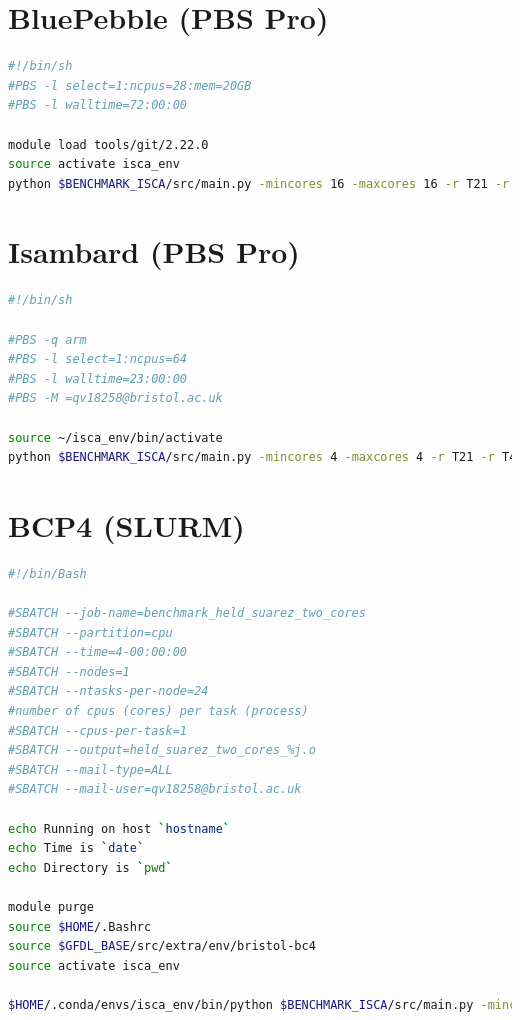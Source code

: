 \documentclass[a4paper,11pt]{report}
\begin{document}
\section*{BluePebble (PBS Pro)}
\begin{lstlisting}[language=Bash, caption={Job submission script for BluePebble}]
#!/bin/sh
#PBS -l select=1:ncpus=28:mem=20GB
#PBS -l walltime=72:00:00

module load tools/git/2.22.0
source activate isca_env
python $BENCHMARK_ISCA/src/main.py -mincores 16 -maxcores 16 -r T21 -r T42 -codebase grey_mars -fc kind_4
\end{lstlisting}



\section*{Isambard (PBS Pro)}
\begin{lstlisting}[language=Bash, caption={Job submission script for Isambard}]
#!/bin/sh

#PBS -q arm
#PBS -l select=1:ncpus=64
#PBS -l walltime=23:00:00
#PBS -M =qv18258@bristol.ac.uk

source ~/isca_env/bin/activate
python $BENCHMARK_ISCA/src/main.py -mincores 4 -maxcores 4 -r T21 -r T42 -r T85 -codebase held_suarez -fc cray_temp
\end{lstlisting}

\section*{BCP4 (SLURM)}

\begin{lstlisting}[language=Bash,caption={Job submission script for BCP4}]
#!/bin/Bash

#SBATCH --job-name=benchmark_held_suarez_two_cores
#SBATCH --partition=cpu
#SBATCH --time=4-00:00:00
#SBATCH --nodes=1
#SBATCH --ntasks-per-node=24
#number of cpus (cores) per task (process)
#SBATCH --cpus-per-task=1
#SBATCH --output=held_suarez_two_cores_%j.o
#SBATCH --mail-type=ALL
#SBATCH --mail-user=qv18258@bristol.ac.uk

echo Running on host `hostname`
echo Time is `date`
echo Directory is `pwd`

module purge
source $HOME/.Bashrc
source $GFDL_BASE/src/extra/env/bristol-bc4
source activate isca_env

$HOME/.conda/envs/isca_env/bin/python $BENCHMARK_ISCA/src/main.py -mincores 2 -maxcores 2 -r T21 -r T42 -codebase held_suarez -fc gcc
\end{lstlisting}
\end{document}
